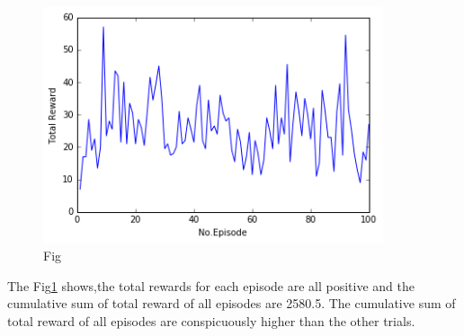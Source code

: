 \documentclass[a4paper,11pt]{article}
\begin{document}
\begin{figure}[H]
\begin{center}
\includegraphics[width=100mm]{graph/gamma_con.jpg}
\end{center}
\caption{Fig}
\label{fig:four}
\end{figure}

The Fig\ref{fig:four} shows,the total rewards for each episode are all positive and the cumulative sum of total reward of all episodes are 2580.5.
The cumulative sum of total reward of all episodes are conspicuously higher than the other trials. 
\end{document}
